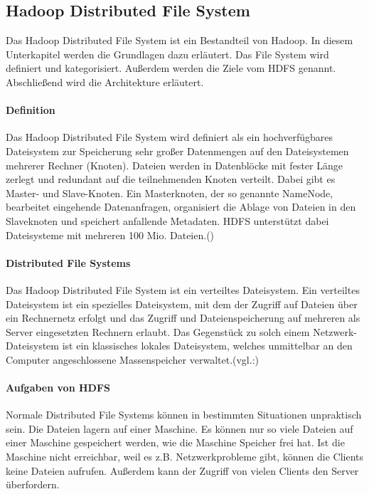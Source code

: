 \newpage

\subsection{Hadoop Distributed File System}
 
Das Hadoop Distributed File System ist ein Bestandteil von Hadoop. In diesem Unterkapitel werden die Grundlagen dazu erläutert. Das File System wird definiert und kategorisiert. Außerdem werden die Ziele vom HDFS genannt. Abschließend wird die Architekture erläutert.  
 

\paragraph{Definition}

Das Hadoop Distributed File System wird definiert als ein \glqq hochverfügbares Dateisystem zur Speicherung sehr großer Datenmengen auf den Dateisystemen mehrerer Rechner (Knoten). Dateien werden in Datenblöcke mit fester Länge zerlegt und redundant auf die teilnehmenden Knoten verteilt. Dabei gibt es Master- und Slave-Knoten. Ein Masterknoten, der so genannte NameNode, bearbeitet eingehende Datenanfragen, organisiert die Ablage von Dateien in den Slaveknoten und speichert anfallende Metadaten. HDFS unterstützt dabei Dateisysteme mit mehreren 100 Mio. Dateien.\grqq (\cite{defhad})

\paragraph{Distributed File Systems}
Das Hadoop Distributed File System ist ein verteiltes Dateisystem. Ein verteiltes Dateisystem ist ein spezielles Dateisystem, mit dem der Zugriff auf Dateien über ein Rechnernetz erfolgt und das Zugriff und Dateienspeicherung auf mehreren als Server eingesetzten Rechnern erlaubt. Das Gegenstück zu solch einem Netzwerk-Dateisystem ist ein klassisches lokales Dateisystem, welches unmittelbar an den Computer angeschlossene Massenspeicher verwaltet.(vgl.:\cite{distributfs})

\paragraph{Aufgaben von HDFS} 
Normale Distributed File Systems können in bestimmten Situationen unpraktisch sein. Die Dateien lagern auf einer Maschine. Es können nur so viele Dateien auf einer Maschine gespeichert werden, wie die Maschine Speicher frei hat. Ist die Maschine nicht erreichbar, weil es z.B. Netzwerkprobleme gibt, können die Clients keine Dateien aufrufen. Außerdem kann der Zugriff von vielen Clients den Server überfordern.

